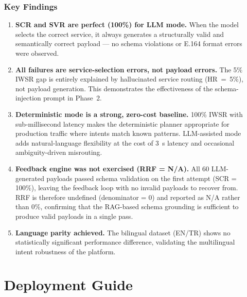 \documentclass[conference]{IEEEtran}
\begin{document}
\subsubsection{Key Findings}

\begin{enumerate}[leftmargin=1.5em]
  \item \textbf{SCR and SVR are perfect (100\%) for LLM mode.}
        When the model selects the correct service, it always generates a
        structurally valid and semantically correct payload — no schema
        violations or E.164 format errors were observed.

  \item \textbf{All failures are service-selection errors, not payload errors.}
        The 5\% IWSR gap is entirely explained by hallucinated service routing
        (HR~=~5\%), not payload generation. This demonstrates the effectiveness
        of the schema-injection prompt in Phase~2.

  \item \textbf{Deterministic mode is a strong, zero-cost baseline.}
        100\% IWSR with sub-millisecond latency makes the deterministic planner
        appropriate for production traffic where intents match known patterns.
        LLM-assisted mode adds natural-language flexibility at the cost of
        3~s latency and occasional ambiguity-driven misrouting.

  \item \textbf{Feedback engine was not exercised (RRF = N/A).}
        All 60 LLM-generated payloads passed schema validation on the first
        attempt (SCR = 100\%), leaving the feedback loop with no invalid
        payloads to recover from. RRF is therefore undefined (denominator
        = 0) and reported as N/A rather than 0\%, confirming that the
        RAG-based schema grounding is sufficient to produce valid payloads
        in a single pass.

  \item \textbf{Language parity achieved.}
        The bilingual dataset (EN/TR) shows no statistically significant
        performance difference, validating the multilingual intent robustness
        of the platform.
\end{enumerate}

\section{Deployment Guide}
\label{sec:deployment}
\end{document}
